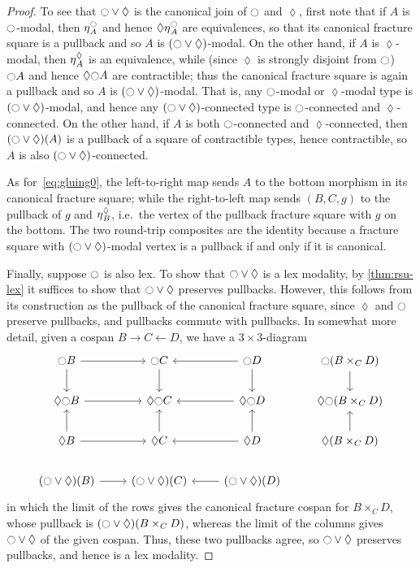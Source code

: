 \begin{proof}
  To see that ${\ocircle}\lor\lozenge$ is the canonical join of ${\ocircle}$ and $\lozenge$, first note that if $A$ is ${\ocircle}$-modal, then ${\eta_{}}^{\ocircle}_A$ and hence $\lozenge{\eta_{}}^{\ocircle}_A$ are equivalences, so that its canonical fracture square is a pullback and so $A$ is $({\ocircle}\lor\lozenge)$-modal.
  On the other hand, if $A$ is $\lozenge$-modal, then ${\eta_{}}^\lozenge_A$ is an equivalence, while (since $\lozenge$ is strongly disjoint from ${\ocircle}$) ${\ocircle} A$ and hence $\lozenge {\ensuremath{\ocircle}} A$ are contractible; thus the canonical fracture square is again a pullback and so $A$ is $({\ocircle}\lor\lozenge)$-modal.
  That is, any ${\ocircle}$-modal or $\lozenge$-modal type is $({\ocircle}\lor\lozenge)$-modal, and hence any $({\ocircle}\lor\lozenge)$-connected type is ${\ocircle}$-connected and $\lozenge$-connected.
  On the other hand, if $A$ is both ${\ocircle}$-connected and $\lozenge$-connected, then $({\ocircle}\lor\lozenge)(A)$ is a pullback of a square of contractible types, hence contractible, so $A$ is also $({\ocircle}\lor\lozenge)$-connected.

  As for~\eqref{eq:gluing0}, the left-to-right map sends $A$ to the bottom morphism in its canonical fracture square; while the right-to-left map sends $(B,C,g)$ to the pullback of $g$ and ${\eta_{}}^\lozenge_B$, i.e.\ the vertex of the pullback fracture square with $g$ on the bottom.
  The two round-trip composites are the identity because a fracture square with $({\ocircle}\lor\lozenge)$-modal vertex is a pullback if and only if it is canonical.

  Finally, suppose ${\ocircle}$ is also lex.
  To show that ${\ocircle}\lor\lozenge$ is a lex modality, by \cref{thm:rsu-lex} it suffices to show that ${\ocircle}\lor\lozenge$ preserves pullbacks.
  However, this follows from its construction as the pullback of the canonical fracture square, since $\lozenge$ and ${\ocircle}$ preserve pullbacks, and pullbacks commute with pullbacks.
  In somewhat more detail, given a cospan $B \to C \leftarrow D$, we have a $3\times 3$-diagram
  \[
  \begin{tikzcd}
    \modal B \ar[r] \ar[d] & \modal C \ar[d] & \modal D \ar[d] \ar[l] & \modal (B\times_C D) \ar[d] \\
    \lozenge \modal B \ar[r] & \lozenge \modal C & \lozenge \modal D \ar[l] & \lozenge\modal (B\times_C D) \\
    \lozenge B \ar[r] \ar[u] & \lozenge C \ar[u] & \lozenge D \ar[u] \ar[l] & \lozenge (B\times_C D) \ar[u]\\
    (\modal\lor\lozenge)(B) \ar[r] & (\modal\lor\lozenge)(C) & (\modal\lor\lozenge)(D) \ar[l] & 
  \end{tikzcd}
  \]
  in which the limit of the rows gives the canonical fracture cospan for $B\times_C D$, whose pullback is $({\ocircle}\lor\lozenge)(B\times_C D)$, whereas the limit of the columns gives ${\ocircle}\lor\lozenge$ of the given cospan.
  Thus, these two pullbacks agree, so ${\ocircle}\lor\lozenge$ preserves pullbacks, and hence is a lex modality.
\end{proof}

